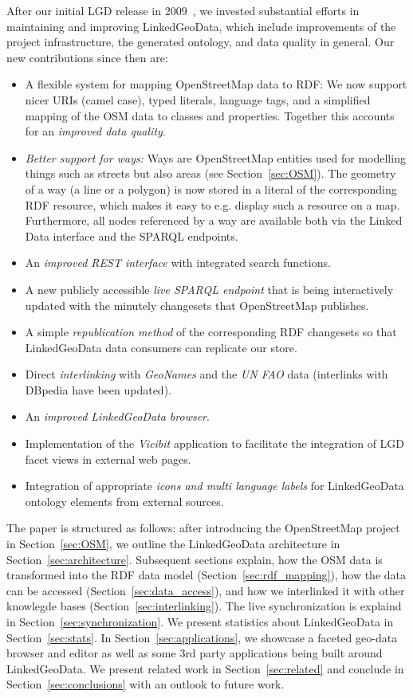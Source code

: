 After our initial LGD release in 2009~\cite{linkedgeodata}, we invested
substantial efforts in maintaining and improving LinkedGeoData, which include
improvements of the project infrastructure, the generated ontology, and data
quality in general. Our new contributions since then are:
\begin{itemize}
  \item A flexible system for mapping OpenStreetMap data to RDF:
  We now support nicer URIs (camel case), typed literals, language tags, and
  a simplified mapping of the OSM data to classes and properties.
  Together this accounts for an \emph{improved data quality}.
  \item \emph{Better support for ways:} Ways are OpenStreetMap entities
  used for modelling things such as streets but also
  areas (see Section~\ref{sec:OSM}).
  The geometry of a way (a line or a polygon) is now
  stored in a literal of the corresponding RDF resource, which makes it
  easy to e.g. display such a resource on a map. Furthermore, all nodes
  referenced by a way are available both via the Linked Data interface and the SPARQL endpoints.
  \item An \emph{improved REST interface} with integrated search functions.
  \item A new publicly accessible \emph{live SPARQL endpoint} that is being
  interactively updated with the minutely changesets that OpenStreetMap publishes.
  \item A simple \emph{republication method} of the corresponding RDF changesets so that LinkedGeoData
  data consumers can replicate our store.
  \item Direct \emph{interlinking} with \textit{GeoNames} and the \textit{UN FAO} data (interlinks with DBpedia have been updated).
  \item An \emph{improved LinkedGeoData browser}.
  \item Implementation of the \emph{Vicibit} application to facilitate the integration of LGD facet views in external web pages.
  \item Integration of appropriate \emph{icons and multi language labels} for LinkedGeoData ontology elements from external sources.
\end{itemize}

The paper is structured as follows: after introducing the OpenStreetMap project
in Section~\ref{sec:OSM}, we outline the LinkedGeoData architecture in
Section~\ref{sec:architecture}.
Subsequent sections explain, how the OSM data is transformed
into the RDF data model (Section~\ref{sec:rdf_mapping}),
how the data can be accessed (Section~\ref{sec:data_access}),
and how we interlinked it with other knowlegde
bases (Section~\ref{sec:interlinking}).
The live synchronization is explaind in Section~\ref{sec:synchronization}.
We present statistics about LinkedGeoData in Section~\ref{sec:stats}.
In Section~\ref{sec:applications}, we showcase a faceted geo-data browser and
editor as well as some 3rd party applications being built around LinkedGeoData. We present related work in
Section~\ref{sec:related} and conclude in Section~\ref{sec:conclusions} with an
outlook to future work.


